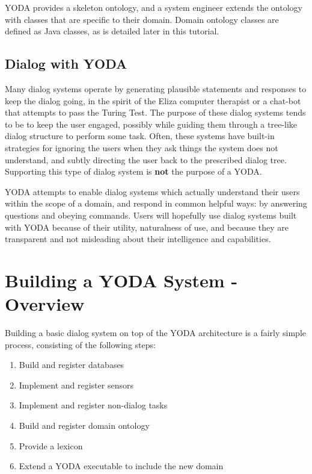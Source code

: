 \documentclass[titlepage]{article}
\begin{document}
YODA provides a skeleton ontology, and a system engineer extends the ontology with classes that are specific to their domain.
Domain ontology classes are defined as Java classes, as is detailed later in this tutorial.

\subsection{Dialog with YODA}

Many dialog systems operate by generating plausible statements and responses to keep the dialog going, in the spirit of the Eliza computer therapist or a chat-bot that attempts to pass the Turing Test.
The purpose of these dialog systems tends to be to keep the user engaged, possibly while guiding them through a tree-like dialog structure to perform some task.
Often, these systems have built-in strategies for ignoring the users when they ask things the system does not understand, and subtly directing the user back to the prescribed dialog tree. 
Supporting this type of dialog system is \textbf{not} the purpose of a YODA.

YODA attempts to enable dialog systems which actually understand their users within the scope of a domain, and respond in common helpful ways: by answering questions and obeying commands.
Users will hopefully use dialog systems built with YODA because of their utility, naturalness of use, and because they are transparent and not misleading about their intelligence and capabilities.

\section{Building a YODA System - Overview}

Building a basic dialog system on top of the YODA architecture is a fairly simple process, consisting of the following steps:

\begin{enumerate}
  \item Build and register databases
  \item Implement and register sensors
  \item Implement and register non-dialog tasks
  \item Build and register domain ontology
  \item Provide a lexicon
  \item Extend a YODA executable to include the new domain
\end{enumerate}
\end{document}
